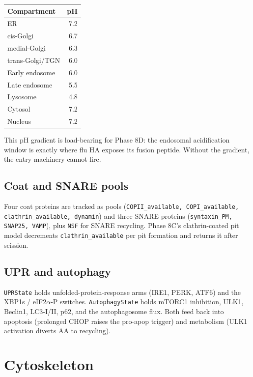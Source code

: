 \documentclass[11pt,letterpaper,twoside,openany]{book}
\newcommand{\code}[1]{\texttt{#1}}
\begin{document}
\begin{center}
\begin{tabular}{lr}
\toprule
Compartment & pH \\ \midrule
ER                  & 7.2 \\
cis-Golgi           & 6.7 \\
medial-Golgi        & 6.3 \\
trans-Golgi/TGN     & 6.0 \\
Early endosome      & 6.0 \\
Late endosome       & 5.5 \\
Lysosome            & 4.8 \\
Cytosol             & 7.2 \\
Nucleus             & 7.2 \\
\bottomrule
\end{tabular}
\end{center}

This pH gradient is load-bearing for Phase 8D: the endosomal
acidification window is exactly where flu HA exposes its fusion
peptide. Without the gradient, the entry machinery cannot fire.

\section{Coat and SNARE pools}

Four coat proteins are tracked as pools
(\code{COPII\_available, COPI\_available, clathrin\_available,
dynamin}) and three SNARE proteins
(\code{syntaxin\_PM, SNAP25, VAMP}), plus \code{NSF} for SNARE
recycling. Phase 8C's clathrin-coated pit model decrements
\code{clathrin\_available} per pit formation and returns it after
scission.

\section{UPR and autophagy}

\code{UPRState} holds unfolded-protein-response arms (IRE1, PERK,
ATF6) and the XBP1s / eIF2$\alpha$-P switches. \code{AutophagyState}
holds mTORC1 inhibition, ULK1, Beclin1, LC3-I/II, p62, and the
autophagosome flux. Both feed back into apoptosis (prolonged CHOP
raises the pro-apop trigger) and metabolism (ULK1 activation diverts
AA to recycling).

\chapter{Cytoskeleton}
\label{ch:cytoskeleton}
\end{document}
